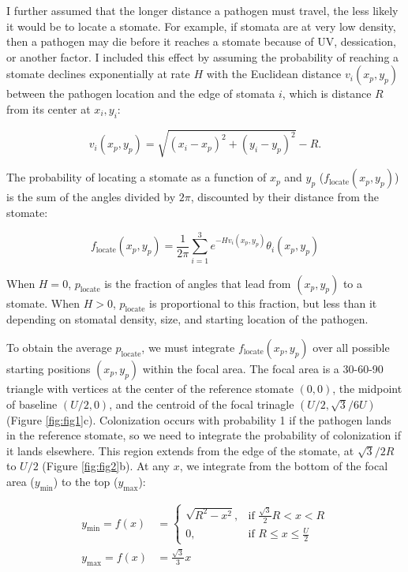 \documentclass[utf8]{frontiersSCNS}
\begin{document}
I further assumed that the longer distance a pathogen must travel, the
less likely it would be to locate a stomate. For example, if stomata are
at very low density, then a pathogen may die before it reaches a stomate
because of UV, dessication, or another factor. I included this effect by
assuming the probability of reaching a stomate declines exponentially at
rate \(H\) with the Euclidean distance \(v_i(x_p,y_p)\) between the
pathogen location and the edge of stomata \(i\), which is distance \(R\)
from its center at \(x_i,y_i\):

\begin{equation}
  v_i(x_p,y_p) = \sqrt{(x_i - x_p) ^ 2 + (y_i - y_p) ^ 2} - R.
\end{equation}

The probability of locating a stomate as a function of \(x_p\) and
\(y_p\) (\(f_\text{locate}(x_p,y_p)\)) is the sum of the angles divided
by \(2\pi\), discounted by their distance from the stomate:

\begin{equation}
  f_\text{locate}(x_p,y_p) = \frac{1}{2 \pi} \sum_{i=1}^3 e^{-H v_i(x_p,y_p)} \theta_i(x_p,y_p)
\end{equation}

When \(H = 0\), \(p_\text{locate}\) is the fraction of angles that lead
from \((x_p,y_p)\) to a stomate. When \(H > 0\), \(p_\text{locate}\) is
proportional to this fraction, but less than it depending on stomatal
density, size, and starting location of the pathogen.

To obtain the average \(p_\text{locate}\), we must integrate
\(f_\text{locate}(x_p,y_p)\) over all possible starting positions
\((x_p,y_p)\) within the focal area. The focal area is a 30-60-90
triangle with vertices at the center of the reference stomate \((0,0)\),
the midpoint of baseline \((U/2,0)\), and the centroid of the focal
trinagle \((U/2, \sqrt{3} / 6 U)\) (Figure \ref{fig:fig1}c).
Colonization occurs with probability 1 if the pathogen lands in the
reference stomate, so we need to integrate the probability of
colonization if it lands elsewhere. This region extends from the edge of
the stomate, at \(\sqrt{3} / 2 R\) to \(U/2\) (Figure \ref{fig:fig2}b).
At any \(x\), we integrate from the bottom of the focal area
(\(y_\text{min}\)) to the top (\(y_\text{max}\)):

\begin{align}
  y_\text{min} = f(x) & = \begin{cases}
    \sqrt{R ^ 2 - x ^ 2}, & \text{if } \frac{\sqrt{3}}{2} R < x < R \\ 
    0, & \text{if } R \leq x \leq \frac{U}{2} \end{cases} \\
  y_\text{max} = f(x) & = \frac{\sqrt{3}}{3} x
\end{align}
\end{document}
